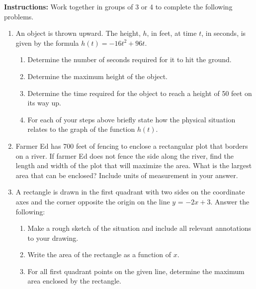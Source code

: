 




\noindent \textbf{Instructions:}  Work together in groups of  3 or 4 to complete the following problems.




\begin{enumerate}

\item An object is thrown upward. The height, $h$, in feet, at time $t$, in seconds, is given by the formula $h(t) = -16t^2 + 96t$. 
\begin{enumerate}
\item Determine the number of seconds required for it to hit the ground. 
\item Determine the maximum height of the object. 
\item Determine the time required for the object to reach a height of
  50 feet on its way up.
\item For each of your steps above briefly state how the physical
  situation relates to the graph of the function $h(t)$.
\end{enumerate}

\vfill

\clearpage

\item Farmer Ed has 700 feet of fencing to enclose a rectangular plot
  that borders on a river.  If farmer Ed does not fence the side along
  the river, find the length and width of the plot that will maximize
  the area.  What is the largest area that can be enclosed?  Include
  units of measurement in your answer.

\vfill




\clearpage

\item A rectangle is drawn in the first quadrant with two sides on the
  coordinate axes and the corner opposite the origin on the line $y$ =
  $-2x+3$.  Answer the following:
  \begin{enumerate}
  \item Make a rough sketch of the situation and include all relevant
    annotations to your drawing.
  \item Write the area of the rectangle as a function of $x$.
  \item For all first quadrant points on the given line, determine the
    maximum area enclosed by the rectangle.
  \end{enumerate}


\end{enumerate}
